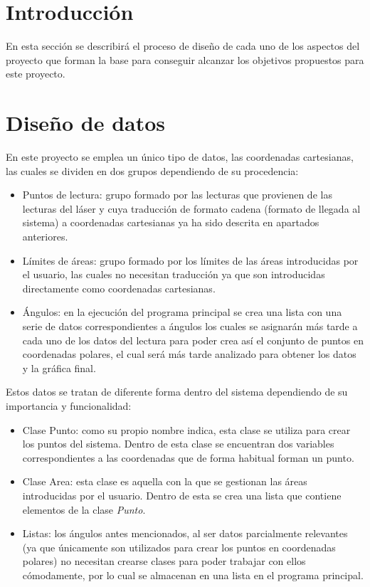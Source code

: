 
\section{Introducción}

En esta sección se describirá el proceso de diseño de cada uno de los aspectos del proyecto que forman la base para conseguir alcanzar los objetivos propuestos para este proyecto.\\

\section{Diseño de datos}

En este proyecto se emplea un único tipo de datos, las coordenadas cartesianas, las cuales se dividen en dos grupos dependiendo de su procedencia:
\begin{itemize}
	\item Puntos de lectura: grupo formado por las lecturas que provienen de las lecturas del láser y cuya traducción de formato cadena (formato de llegada al sistema) a coordenadas cartesianas ya ha sido descrita en apartados anteriores.
	\item Límites de áreas: grupo formado por los límites de las áreas introducidas por el usuario, las cuales no necesitan traducción ya que son introducidas directamente como coordenadas cartesianas.
	\item Ángulos: en la ejecución del programa principal se crea una lista con una serie de datos correspondientes a ángulos los cuales se asignarán más tarde a cada uno de los datos del lectura para poder crea así el conjunto de puntos en coordenadas polares, el cual será más tarde analizado para obtener los datos y la gráfica final.
\end{itemize}
Estos datos se tratan de diferente forma dentro del sistema dependiendo de su importancia y funcionalidad:\\
\begin{itemize}
	\item Clase Punto: como su propio nombre indica, esta clase se utiliza para crear los puntos del sistema. Dentro de esta clase se encuentran dos variables correspondientes a las coordenadas que de forma habitual forman un punto.
	\item Clase Area: esta clase es aquella con la que se gestionan las áreas introducidas por el usuario. Dentro de esta se crea una lista que contiene elementos de la clase \textit{Punto}.
	\item Listas: los ángulos antes mencionados, al ser datos parcialmente relevantes (ya que únicamente son utilizados para crear los puntos en coordenadas polares) no necesitan crearse clases para poder trabajar con ellos cómodamente, por lo cual se almacenan en una lista en el programa principal.
\end{itemize}

